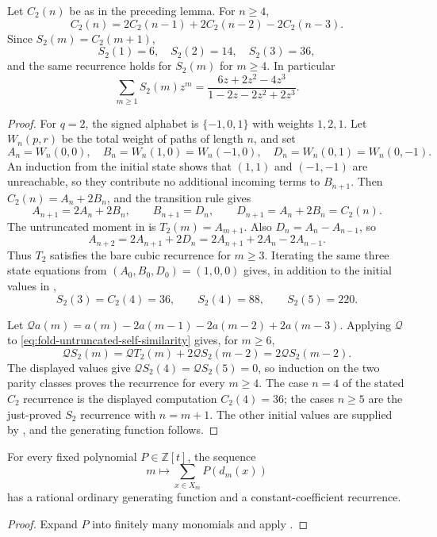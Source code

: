 \begin{theorem}
\label{thm:intrinsic-second-moment-recurrence}
Let \(C_2(n)\) be as in the preceding lemma.  For \(n\ge4\),
\[
 C_2(n)=2C_2(n-1)+2C_2(n-2)-2C_2(n-3).
\]
Since \(S_2(m)=C_2(m+1)\),
\[
 S_2(1)=6,\quad S_2(2)=14,\quad S_2(3)=36,
\]
and the same recurrence holds for \(S_2(m)\) for \(m\ge4\).  In particular
\[
 \sum_{m\ge1}S_2(m)z^m
 =\frac{6z+2z^2-4z^3}{1-2z-2z^2+2z^3}.
\]
\end{theorem}
\begin{proof}
For \(q=2\), the signed alphabet is \(\{-1,0,1\}\) with weights
\(1,2,1\).  Let \(W_n(p,r)\) be the total weight of paths of length \(n\),
and set
\[
 A_n=W_n(0,0),\quad B_n=W_n(1,0)=W_n(-1,0),\quad
 D_n=W_n(0,1)=W_n(0,-1).
\]
An induction from the initial state shows that \((1,1)\) and \((-1,-1)\) are
unreachable, so they contribute no additional incoming terms to \(B_{n+1}\).
Then \(C_2(n)=A_n+2B_n\), and the transition rule gives
\[
 A_{n+1}=2A_n+2B_n,\qquad B_{n+1}=D_n,\qquad
 D_{n+1}=A_n+2B_n=C_2(n).
\]
The untruncated moment in
 is \(T_2(m)=A_{m+1}\).  Also
\(D_n=A_n-A_{n-1}\), so
\[
 A_{n+2}=2A_{n+1}+2D_n
        =2A_{n+1}+2A_n-2A_{n-1}.
\]
Thus \(T_2\) satisfies the bare cubic recurrence for \(m\ge3\).  Iterating the
same three state equations from \((A_0,B_0,D_0)=(1,0,0)\) gives, in addition
to the initial values in ,
\[
 S_2(3)=C_2(4)=36,\qquad S_2(4)=88,\qquad S_2(5)=220.
\]

Let
\(\mathcal Q a(m)=a(m)-2a(m-1)-2a(m-2)+2a(m-3)\).  Applying \(\mathcal Q\)
to \eqref{eq:fold-untruncated-self-similarity} gives, for \(m\ge6\),
\[
 \mathcal Q S_2(m)=\mathcal Q T_2(m)+2\mathcal Q S_2(m-2)
                  =2\mathcal Q S_2(m-2).
\]
The displayed values give \(\mathcal Q S_2(4)=\mathcal Q S_2(5)=0\), so
induction on the two parity classes proves the recurrence for every \(m\ge4\).
The case \(n=4\) of the stated \(C_2\) recurrence is the displayed computation
\(C_2(4)=36\); the cases \(n\ge5\) are the just-proved \(S_2\) recurrence with
\(n=m+1\).  The other initial values are supplied by
, and the generating function
follows.
\end{proof}

\begin{corollary}
\label{cor:polynomial-intrinsic-fiber-statistics}
For every fixed polynomial \(P\in\mathbb Z[t]\), the sequence
\[
 m\longmapsto\sum_{x\in X_m}P(d_m(x))
\]
has a rational ordinary generating function and a constant-coefficient
recurrence.
\end{corollary}
\begin{proof}
Expand \(P\) into finitely many monomials and apply
.
\end{proof}

